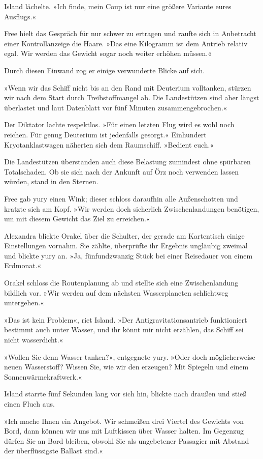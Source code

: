 Island lächelte. »Ich finde, mein Coup ist nur eine größere Variante eures Ausflugs.«

Free hielt das Gespräch für nur schwer zu ertragen und raufte sich in Anbetracht einer Kontrollanzeige die Haare. »Das eine Kilogramm ist dem Antrieb relativ egal. Wir werden das Gewicht sogar noch weiter erhöhen müssen.«

Durch diesen Einwand zog er einige verwunderte Blicke auf sich.

»Wenn wir das Schiff nicht bis an den Rand mit Deuterium volltanken, stürzen wir nach dem Start durch Treibstoffmangel ab. Die Landestützen sind aber längst überlastet und laut Datenblatt vor fünf Minuten zusammengebrochen.«

Der Diktator lachte respektlos. »Für einen letzten Flug wird es wohl noch reichen. Für genug Deuterium ist jedenfalls gesorgt.« Einhundert Kryotanklastwagen näherten sich dem Raumschiff. »Bedient euch.«

Die Landestützen überstanden auch diese Belastung zumindest ohne spürbaren Totalschaden. Ob sie sich nach der Ankunft auf Örz noch verwenden lassen würden, stand in den Sternen.

Free gab yury einen Wink; dieser schloss daraufhin alle Außenschotten und kratzte sich am Kopf. »Wir werden doch sicherlich Zwischenlandungen benötigen, um mit diesem Gewicht das Ziel zu erreichen.«

Alexandra blickte Orakel über die Schulter, der gerade am Kartentisch einige Einstellungen vornahm. Sie zählte, überprüfte ihr Ergebnis ungläubig zweimal und blickte yury an. »Ja, fünfundzwanzig Stück bei einer Reisedauer von einem Erdmonat.«

Orakel schloss die Routenplanung ab und stellte sich eine Zwischenlandung bildlich vor. »Wir werden auf dem nächsten Wasserplaneten schlichtweg untergehen.«

»Das ist kein Problem«, riet Island. »Der Antigravitationsantrieb funktioniert bestimmt auch unter Wasser, und ihr könnt mir nicht erzählen, das Schiff sei nicht wasserdicht.«

»Wollen Sie denn Wasser tanken?«, entgegnete yury. »Oder doch möglicherweise neuen Wasserstoff? Wissen Sie, wie wir den erzeugen? Mit Spiegeln und einem Sonnenwärmekraftwerk.«

Island starrte fünf Sekunden lang vor sich hin, blickte nach draußen und stieß einen Fluch aus.

»Ich mache Ihnen ein Angebot. Wir schmeißen drei Viertel des Gewichts von Bord, dann können wir uns mit Luftkissen über Wasser halten. Im Gegenzug dürfen Sie an Bord bleiben, obwohl Sie als ungebetener Passagier mit Abstand der überflüssigste Ballast sind.«

